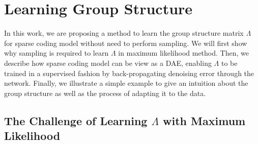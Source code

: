 \section{Learning Group Structure}
\label{sec:learning_group}

In this work, we are proposing a method to learn the group structure matrix $\Lambda$ for sparse coding model without need to perform sampling. We will first show why sampling is required to learn $\Lambda$ in maximum likelihood method. Then, we describe how sparse coding model can be view as a DAE, enabling $\Lambda$ to be trained in a supervised fashion by back-propagating denoising error through the network. Finally, we illustrate a simple example to give an intuition about the group structure as well as the process of adapting it to the data.

\subsection{The Challenge of Learning $\Lambda$ with Maximum Likelihood}

